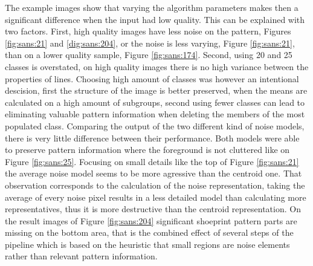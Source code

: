 \documentclass[draft,final]{vutinfth} %
\begin{document}
\par
The example images show that varying the algorithm parameters makes then a significant difference when the input had low quality.
This can be explained with two factors.
First, high quality images have less noise on the pattern, Figures \ref{fig:sans:21} and \ref{dig:sans:204}, or the noise is less varying, Figure \ref{fig:sans:21}, than on a lower quality sample, Figure \ref{fig:sans:174}.
Second, using 20 and 25 classes is overstated, on high quality images there is no high variance between the properties of lines.
Choosing high amount of classes was however an intentional descision, first the structure of the image is better preserved, when the means are calculated on a high amount of subgroups, second using fewer classes can lead to eliminating valuable pattern information when deleting the members of the most populated class.
Comparing the output of the two different kind of noise models, there is very little difference between their performance.
Both models were able to preserve pattern information where the foreground is not cluttered like on Figure \ref{fig:sans:25}.
Focusing on small details like the top of Figure \ref{fig:sans:21} the average noise model seems to be more agressive than the centroid one.
That observation corresponds to the calculation of the noise representation, taking the average of every noise pixel results in a less detailed model than calculating more representatives, thus it is more destructive than the centroid representation.
On the result images of Figure \ref{fig:sans:204} significant shoeprint pattern parts are missing on the bottom area, that is the combined effect of several steps of the pipeline which is based on the heuristic that small regions are noise elements rather than relevant pattern information.
\end{document}
